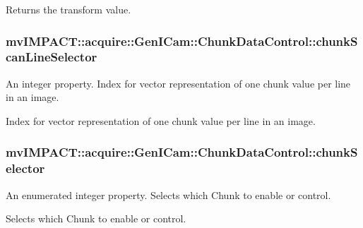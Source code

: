 Returns the transform value. \hypertarget{classmv_i_m_p_a_c_t_1_1acquire_1_1_gen_i_cam_1_1_chunk_data_control_a6974218ada079b8968619a5e54ea8232}{
\subsubsection[{chunk\+Scan\+Line\+Selector}]{ mv\+I\+M\+P\+A\+C\+T\+::acquire\+::\+Gen\+I\+Cam\+::\+Chunk\+Data\+Control\+::chunk\+Scan\+Line\+Selector}}\label{classmv_i_m_p_a_c_t_1_1acquire_1_1_gen_i_cam_1_1_chunk_data_control_a6974218ada079b8968619a5e54ea8232}


An integer property. Index for vector representation of one chunk value per line in an image. 

Index for vector representation of one chunk value per line in an image. \hypertarget{classmv_i_m_p_a_c_t_1_1acquire_1_1_gen_i_cam_1_1_chunk_data_control_afa89c2551ad7b82a5a6ce641cc169523}{
\subsubsection[{chunk\+Selector}]{ mv\+I\+M\+P\+A\+C\+T\+::acquire\+::\+Gen\+I\+Cam\+::\+Chunk\+Data\+Control\+::chunk\+Selector}}\label{classmv_i_m_p_a_c_t_1_1acquire_1_1_gen_i_cam_1_1_chunk_data_control_afa89c2551ad7b82a5a6ce641cc169523}


An enumerated integer property. Selects which Chunk to enable or control. 

Selects which Chunk to enable or control.

